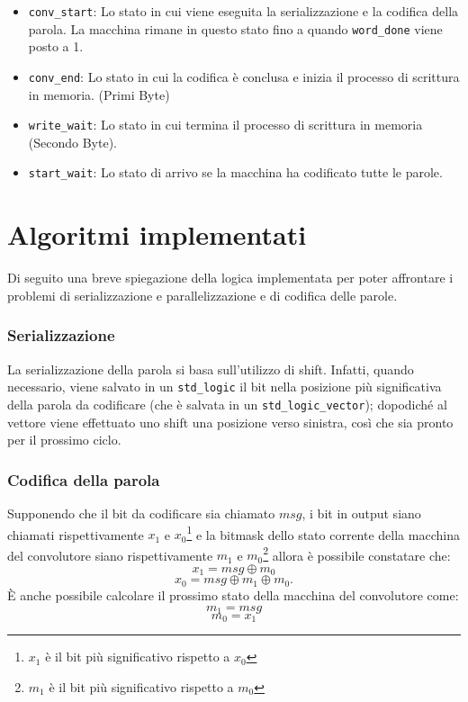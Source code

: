 \begin{itemize}
    \item \texttt{conv\_start}: Lo stato in cui viene eseguita la serializzazione e la codifica della parola. La macchina rimane in questo stato fino a quando \texttt{word\_done} viene posto a 1.
    \item \texttt{conv\_end}: Lo stato in cui la codifica è conclusa e inizia il processo di scrittura in memoria. (Primi Byte)
    \item \texttt{write\_wait}: Lo stato in cui termina il processo di scrittura in memoria (Secondo Byte).
    \item \texttt{start\_wait}: Lo stato di arrivo se la macchina ha codificato tutte le parole.
\end{itemize}

\section{Algoritmi implementati}
Di seguito una breve spiegazione della logica implementata per poter affrontare i problemi di serializzazione e parallelizzazione e di codifica delle parole.
\subsubsection{Serializzazione}
La serializzazione della parola si basa sull'utilizzo di shift. Infatti, quando necessario, viene salvato in un \texttt{std\_logic} il bit nella posizione più significativa della parola da codificare (che è salvata in un \texttt{std\_logic\_vector}); dopodiché al vettore viene effettuato uno shift una posizione verso sinistra, così che sia pronto per il prossimo ciclo.

\subsubsection{Codifica della parola} \label{codifica}
Supponendo che il bit da codificare sia chiamato \( msg \), i bit in output siano chiamati rispettivamente \( x_1 \) e \( x_0 \)\footnote{ \( x_1 \) è il bit più significativo rispetto a \( x_0 \)} e la bitmask dello stato corrente della macchina del convolutore siano rispettivamente \( m_1 \) e \( m_0 \)\footnote{ \( m_1 \) è il bit più significativo  rispetto a \( m_0 \)} allora è possibile constatare che:
\[ x_1 = msg \oplus m_0 \] \[ x_0 = msg \oplus m_1 \oplus m_0.\]
È anche possibile calcolare il prossimo stato della macchina del convolutore come:
\[ m_1 = msg\] \[ m_0 = x_1\]

